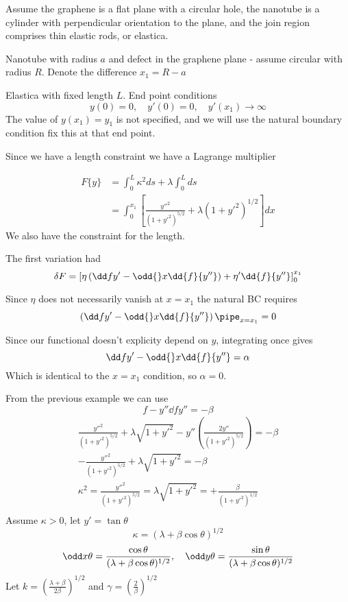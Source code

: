 \documentclass{E:/Documents/Latex/myassignment}
\begin{document}
Assume the graphene is a flat plane with a circular hole, the nanotube is a cylinder with perpendicular orientation to the plane, and the join region comprises thin elastic rods, or elastica. 

Nanotube with radius $a$ and defect in the graphene plane - assume circular with radius $R$. Denote the difference $x_1 = R-a$

Elastica with fixed length $L$.
End point conditions
\[y(0) = 0 ,\quad y'(0) = 0 ,\quad y'(x_1) \to \infty\]
The value of $y(x_1) = y_1$ is not specified, and we will use the natural boundary condition fix this at that end point.


Since we have a length constraint we have a Lagrange multiplier

\begin{align*}
	F\{y\} &= \int_0^L \kappa^2 ds + \lambda \int_0^L ds\\
	&=	\int_0^{x_1} \left[\frac{y''^2}{(1+y'^2)^{5/2}} + \lambda (1+y'^2)^{1/2}\right] dx
\end{align*}
We also have the constraint for the length.

The first variation had
\[\delta F = \left[\eta \left(\dd f{y'} - \odd{}x \dd{f}{y''}\right) + \eta' \dd{f}{y''}\right]_0^{x_1}\]

Since $\eta$ does not necessarily vanish at $x=x_1$ the natural BC requires
\[\left(\dd f{y'} - \odd{}x \dd{f}{y''}\right)\pipe_{x=x_1} = 0\]



Since our functional doesn't explicity depend on $y$, integrating once gives
\[\dd f{y'} - \odd{}x \dd{f}{y''} = \alpha\]
Which is identical to the $x=x_1$ condition, so $\alpha= 0$.


From the previous example we can use
\[f - y'' \dd{f}{y''} = - \beta\]
\begin{align*}
	 \frac{y''^2}{(1+y'^2)^{5/2}} + \lambda\sqrt{1+ y'^2} - y'' \left(\frac{2 y''}{(1+y'^2)^{5/2}}\right) = -\beta\\
	 -\frac{y''^2}{(1+y'^2)^{5/2}} + \lambda\sqrt{1+ y'^2} = -\beta\\
	 \kappa^2 = \frac{y''^2}{(1+y'^2)^{5/2}} = \lambda\sqrt{1+ y'^2} = + \frac{\beta}{(1+y'^2)^{1/2}}\\
\end{align*}
Assume $\kappa > 0$, let $ y' = \tan \theta$
\[\kappa = (\lambda + \beta\cos\theta)^{1/2}\]
\[\odd x\theta = \frac{\cos\theta}{(\lambda + \beta\cos\theta)^{1/2}}, \quad \odd y\theta = \frac{\sin\theta}{(\lambda + \beta \cos\theta)^{1/2}}\]
Let $k = \left(\frac{\lambda + \beta}{2 \beta}\right)^{1/2}$ and $\gamma = \left(\frac{2}{\beta}\right)^{1/2}$
\end{document}
